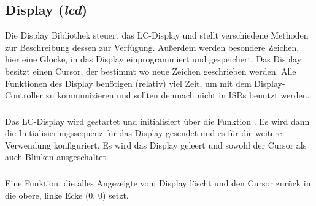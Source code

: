 
\subsection{Display (\emph{lcd})}
Die Display Bibliothek steuert das LC-Display und stellt verschiedene Methoden zur Beschreibung dessen zur Verfügung.
Außerdem werden besondere Zeichen, hier eine Glocke, in das Display einprogrammiert und gespeichert. Das Display besitzt einen Cursor, der bestimmt wo neue Zeichen geschrieben werden.
\newline
Alle Funktionen des Display benötigen (relativ) viel Zeit, um mit dem Display-Controller zu kommunizieren und sollten demnach nicht in ISRs benutzt werden.
\subsubsection{}
Das LC-Display wird gestartet und initialisiert über die Funktion . Es wird dann die Initialisierungssequenz für das Display gesendet und es für die weitere Verwendung konfiguriert. Es wird das Display geleert und sowohl der Cursor als auch Blinken ausgeschaltet.
\subsubsection{}
Eine Funktion, die alles Angezeigte vom Display löscht und den Cursor zurück in die obere, linke Ecke (0, 0) setzt.
